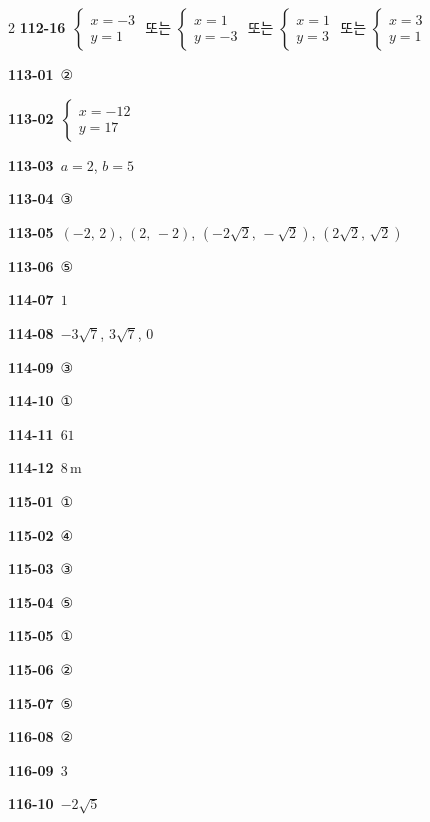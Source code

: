 \documentclass[10pt,a4paper]{article}
\begin{document}
\begin{multicols}{2}
\noindent\textbf{112-16}\ $\begin{cases} x=-3 \\ y=1 \end{cases}$ 또는 $\begin{cases} x=1 \\ y=-3 \end{cases}$ 또는 $\begin{cases} x=1 \\ y=3 \end{cases}$ 또는 $\begin{cases} x=3 \\ y=1 \end{cases}$\par
\noindent\textbf{113-01}\ ②\par
\noindent\textbf{113-02}\ $\begin{cases} x=-12 \\ y=17 \end{cases}$\par
\noindent\textbf{113-03}\ $a=2$, $b=5$\par
\noindent\textbf{113-04}\ ③\par
\noindent\textbf{113-05}\ $(-2,\,2)$, $(2,\,-2)$, $(-2\sqrt{2},\,-\sqrt{2})$, $(2\sqrt{2},\,\sqrt{2})$\par
\noindent\textbf{113-06}\ ⑤\par
\noindent\textbf{114-07}\ $1$\par
\noindent\textbf{114-08}\ $-3\sqrt{7}$, $3\sqrt{7}$, $0$\par
\noindent\textbf{114-09}\ ③\par
\noindent\textbf{114-10}\ ①\par
\noindent\textbf{114-11}\ $61$\par
\noindent\textbf{114-12}\ $8\,\mathrm{m}$\par
\noindent\textbf{115-01}\ ①\par
\noindent\textbf{115-02}\ ④\par
\noindent\textbf{115-03}\ ③\par
\noindent\textbf{115-04}\ ⑤\par
\noindent\textbf{115-05}\ ①\par
\noindent\textbf{115-06}\ ②\par
\noindent\textbf{115-07}\ ⑤\par
\noindent\textbf{116-08}\ ②\par
\noindent\textbf{116-09}\ $3$\par
\noindent\textbf{116-10}\ $-2\sqrt{5}$\par

\end{multicols}
\end{document}
